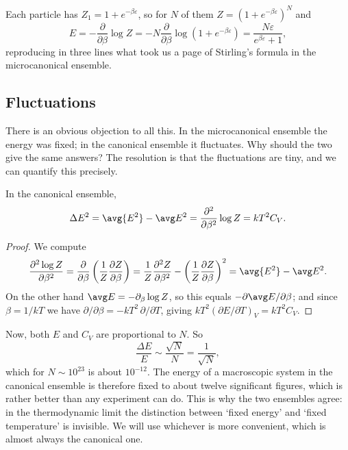 \begin{example}
	Each particle has $Z_1 = 1 + e^{-\beta \varepsilon}$, so for $N$ of them $Z = (1+e^{-\beta\varepsilon})^N$ and
	$$
	E = -\frac{\partial}{\partial\beta} \log Z = -N \frac{\partial}{\partial \beta}\log(1+e^{-\beta\varepsilon}) = \frac{N\varepsilon}{e^{\beta\varepsilon}+1},
	$$
	reproducing in three lines what took us a page of Stirling's formula in the microcanonical ensemble.
\end{example}

\subsection{Fluctuations}

There is an obvious objection to all this. In the microcanonical ensemble the energy was fixed; in the canonical ensemble it fluctuates. Why should the two give the same answers? The resolution is that the fluctuations are tiny, and we can quantify this precisely.

\begin{proposition}
	In the canonical ensemble,
	$$
	\Delta E^2 = \avg{E^2} - \avg E^2 = \frac{\partial^2}{\partial\beta^2}\log Z = k T^2 C_V.
	$$
\end{proposition}
\begin{proof}
	We compute
	$$
	\frac{\partial^2 \log Z}{\partial \beta^2} = \frac{\partial}{\partial\beta}\left(\frac{1}{Z}\frac{\partial Z}{\partial\beta}\right) = \frac{1}{Z}\frac{\partial^2 Z}{\partial \beta^2} - \left(\frac 1Z \frac{\partial Z}{\partial \beta}\right)^2 = \avg{E^2} - \avg E^2.
	$$
	On the other hand $\avg E = -\partial_\beta \log Z$, so this equals $-\partial \avg E/\partial\beta$; and since $\beta = 1/kT$ we have $\partial/\partial\beta = -kT^2\, \partial/\partial T$, giving $kT^2 (\partial E/\partial T)_V = kT^2 C_V$.
\end{proof}

Now, both $E$ and $C_V$ are proportional to $N$. So
$$
\frac{\Delta E}{E} \sim \frac{\sqrt N}{N} = \frac{1}{\sqrt N},
$$
which for $N \sim 10^{23}$ is about $10^{-12}$. The energy of a macroscopic system in the canonical ensemble is therefore fixed to about twelve significant figures, which is rather better than any experiment can do. This is why the two ensembles agree: in the thermodynamic limit the distinction between `fixed energy' and `fixed temperature' is invisible. We will use whichever is more convenient, which is almost always the canonical one.

